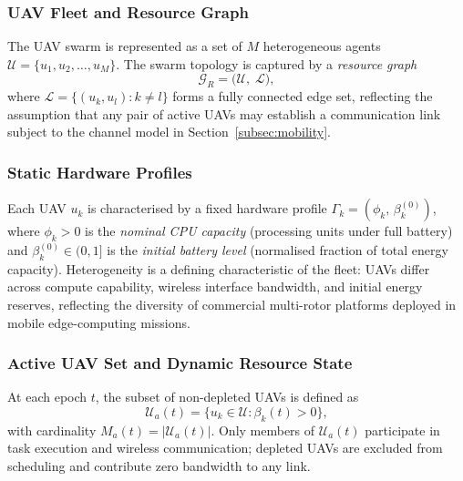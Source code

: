 \subsubsection*{UAV Fleet and Resource Graph}

The UAV swarm is represented as a set of $M$ heterogeneous agents
$\mathcal{U} = \{u_1, u_2, \ldots, u_M\}$.
The swarm topology is captured by a \emph{resource graph}
\begin{equation}
  \mathcal{G}_R = \bigl(\mathcal{U},\; \mathcal{L}\bigr),
  \label{eq:resource_graph}
\end{equation}
where $\mathcal{L} = \{(u_k, u_l) : k \neq l\}$ forms a fully
connected edge set, reflecting the assumption that any pair of active
UAVs may establish a communication link subject to the channel model
in Section~\ref{subsec:mobility}.

\subsubsection*{Static Hardware Profiles}

Each UAV $u_k$ is characterised by a fixed hardware profile
$\Gamma_k = (\phi_k,\, \beta_k^{(0)})$, where $\phi_k > 0$ is the
\emph{nominal CPU capacity} (processing units under full battery) and
$\beta_k^{(0)} \in (0, 1]$ is the \emph{initial battery level}
(normalised fraction of total energy capacity).
Heterogeneity is a defining characteristic of the fleet: UAVs
differ across compute capability, wireless interface bandwidth, and
initial energy reserves, reflecting the diversity of commercial
multi-rotor platforms deployed in mobile edge-computing missions.

\subsubsection*{Active UAV Set and Dynamic Resource State}

At each epoch $t$, the subset of non-depleted UAVs is defined as
\begin{equation}
  \mathcal{U}_a(t) = \bigl\{u_k \in \mathcal{U} :
    \beta_k(t) > 0 \bigr\},
  \label{eq:active_set}
\end{equation}
with cardinality $M_a(t) = |\mathcal{U}_a(t)|$.
Only members of $\mathcal{U}_a(t)$ participate in task execution and
wireless communication; depleted UAVs are excluded from scheduling
and contribute zero bandwidth to any link.


